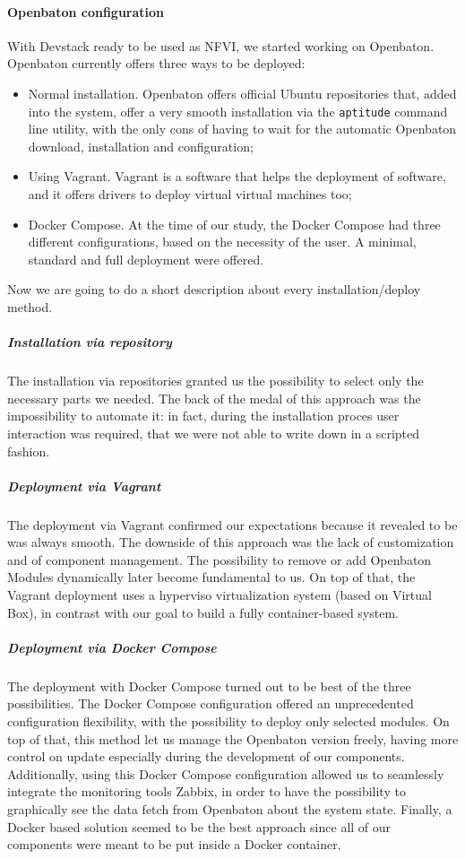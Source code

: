 \paragraph*{Openbaton configuration}
With Devstack ready to be used as NFVI, we started working on Openbaton.
Openbaton currently offers three ways to be deployed:
\begin{itemize}
  \item Normal installation. Openbaton offers official Ubuntu repositories that,
    added into the system, offer a very smooth installation via the
    \verb!aptitude! command line utility, with the only cons of having to wait
    for the automatic Openbaton download, installation and configuration;
  \item Using Vagrant. Vagrant is a software that helps the deployment of
    software, and it offers drivers to deploy virtual virtual machines too;
  \item Docker Compose. At the time of our study, the Docker Compose had three
    different configurations, based on the necessity of the user. A minimal,
    standard and full deployment were offered.
\end{itemize}

Now we are going to do a short description about every installation/deploy method.

\subparagraph*{Installation via repository}
The installation via repositories granted us the possibility to select only the
necessary parts we needed. The back of the medal of this approach was the
impossibility to automate it: in fact, during the installation proces user
interaction was required, that we were not able to write down in a scripted
fashion.

\subparagraph*{Deployment via Vagrant}
The deployment via Vagrant confirmed our expectations because it revealed to be
was always smooth. The downside of this approach was the lack of customization
and of component management. The possibility to remove or add Openbaton Modules
dynamically later become fundamental to us. On top of that, the Vagrant
deployment uses a hyperviso virtualization system (based on Virtual Box), in
contrast with our goal to build a fully container-based system.

\subparagraph*{Deployment via Docker Compose}
The deployment with Docker Compose turned out to be best of the three
possibilities. The Docker Compose configuration offered an unprecedented
configuration flexibility, with the possibility to deploy only selected modules.
On top of that, this method let us manage the Openbaton version freely, having
more control on update especially during the development of our components.
Additionally, using this Docker Compose configuration allowed us to seamlessly
integrate the monitoring tools Zabbix, in order to have the possibility to
graphically see the data fetch from Openbaton about the system state. Finally, a
Docker based solution seemed to be the best approach since all of our components
were meant to be put inside a Docker container.

